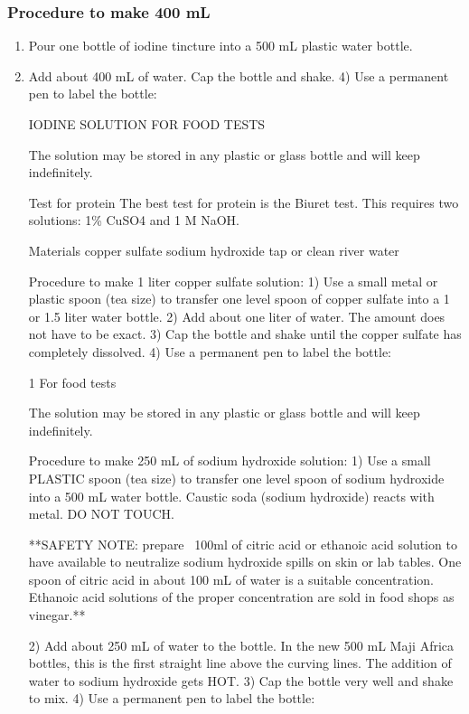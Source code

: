 \subsubsection{Procedure to make 400 mL}
\begin{enumerate}
\item{Pour one bottle of iodine tincture into a 500 mL plastic water bottle.}
\item{Add about 400 mL of water.}
Cap the bottle and shake.
4)	Use a permanent pen to label the bottle:

IODINE SOLUTION FOR FOOD TESTS

	The solution may be stored in any plastic or glass bottle and will keep indefinitely.

Test for protein
The best test for protein is the Biuret test. This requires two solutions: 1\% CuSO4 and 1 M NaOH.

Materials
	copper sulfate
	sodium hydroxide
	tap or clean river water	

Procedure to make 1 liter copper sulfate solution:
1)	Use a small metal or plastic spoon (tea size) to transfer one level spoon of copper sulfate into 	a 1 or 1.5 liter water bottle.
2)	Add about one liter of water. The amount does not have to be exact.
3)	Cap the bottle and shake until the copper sulfate has completely dissolved.
4)	Use a permanent pen to label the bottle:


1%
For food tests

The solution may be stored in any plastic or glass bottle and will keep indefinitely.

Procedure to make 250 mL of sodium hydroxide solution:
1)	Use a small PLASTIC spoon (tea size) to transfer one level spoon of sodium hydroxide into a 500 mL 	water bottle. Caustic soda (sodium hydroxide) reacts with metal. DO NOT TOUCH.

**SAFETY NOTE: prepare ~100ml of citric acid or ethanoic acid solution to have available to neutralize sodium hydroxide spills on skin or lab tables. One spoon of citric acid in about 100 mL of water is a suitable concentration. Ethanoic acid solutions of the proper concentration are sold in food shops as vinegar.**

2)	Add about 250 mL of water to the bottle. In the new 500 mL Maji Africa bottles, this is the first 	straight line above the curving lines. The addition of water to sodium hydroxide gets HOT.
3)	Cap the bottle very well and shake to mix.
4)	Use a permanent pen to label the bottle:


\end{enumerate}

